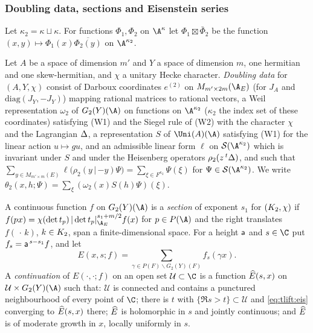 \subsubsection*{Doubling data, sections and Eisenstein series}
Let $\kappa_2=\kappa\sqcup\kappa$. For functions $\Phi_1,\Phi_2$ on $\A^\kappa$ let $\Phi_1\boxtimes\bar\Phi_2$ be the
function $(x,y)\mapsto\Phi_1(x)\overline{\Phi_2(y)}$ on $\A^{\kappa_2}$.

\begin{definition}\label{pf:tlift:dbl}
Let $A$ be a space of dimension $m'$ and $Y$ a space of dimension $m$, one hermitian and one
skew-hermitian, and $\chi$ a unitary Hecke character. \emph{Doubling data} for $(A,Y,\chi)$ consist of
Darboux coordinates $e^{(2)}$ on $M_{m'\times2m}(\tliftAE)$ (for $J_A$ and $\mathrm{diag}(J_Y,-J_Y)$) mapping
rational matrices to rational vectors, a Weil representation $\omega_2$ of $G_2(Y)(\A)$ on functions on
$\A^{\kappa_2}$ ($\kappa_2$ the index set of these coordinates) satisfying (W1) and the Siegel rule of (W2) with
the character $\chi$ and the Lagrangian $\Delta$, a representation $S$ of $\Uni(A)(\A)$ satisfying (W1) for
the linear action $u\mapsto gu$, and an admissible linear form $\ell$ on $\tliftS(\A^{\kappa_2})$ which is
invariant under $S$ and under the Heisenberg operators $\rho_2(z\,{}^t\Delta)$, and such that
$\sum_{y\in M_{m'\times m}(E)}\ell\bigl(\rho_2(y\,|\,{-y})\Psi\bigr)=\sum_{\xi\in F^{\kappa_2}}\Psi(\xi)$ for
$\Psi\in\tliftS(\A^{\kappa_2})$. We write $\theta_2(x,h;\Psi)=\sum_\xi(\omega_2(x)S(h)\Psi)(\xi)$.
\end{definition}

\begin{definition}\label{pf:tlift:eiscont}
A continuous function $f$ on $G_2(Y)(\A)$ is a \emph{section} of exponent $s_1$ for $(K_2,\chi)$ if
$f(px)=\chi(\det t_p)\,|\det t_p|_{\tliftAE}^{s_1+m/2}f(x)$ for $p\in P(\A)$ and the right translates
$f(\,\cdot\,k)$, $k\in K_2$, span a finite-dimensional space. For a height $\mathsf{a}$ and $s\in\C$ put
$f_s=\mathsf{a}^{\,s-s_1}f$, and let
\begin{equation}\label{eq:tlift:eis}
  E(x,s;f)=\sum_{\gamma\in P(F)\backslash G_2(Y)(F)}f_s(\gamma x).
\end{equation}
A \emph{continuation} of $E(\cdot,\cdot;f)$ on an open set $\mathcal U\subset\C$ is a function $\widehat{E}(s,x)$ on
$\mathcal U\times G_2(Y)(\A)$ such that: $\mathcal U$ is connected and contains a punctured neighbourhood of
every point of $\C$; there is $t$ with $\{\Re s>t\}\subset\mathcal U$ and \eqref{eq:tlift:eis} converging to
$\widehat{E}(s,x)$ there; $\widehat{E}$ is holomorphic in $s$ and jointly continuous; and $\widehat{E}$ is of moderate
growth in $x$, locally uniformly in $s$. 
\end{definition}

